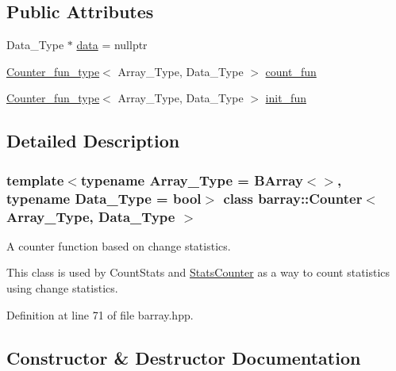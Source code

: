 \subsection*{Public Attributes}
\begin{DoxyCompactItemize}
\item 
Data\+\_\+\+Type $\ast$ \hyperlink{classbarray_1_1_counter_a8889606c8da26b72927ccc964a5f844a}{data} = nullptr
\item 
\hyperlink{namespacebarray_a94903bd0f37708633933ea88ac8e4c6a}{Counter\+\_\+fun\+\_\+type}$<$ Array\+\_\+\+Type, Data\+\_\+\+Type $>$ \hyperlink{classbarray_1_1_counter_a3da828c8a55302a3cbda73bb46916c36}{count\+\_\+fun}
\item 
\hyperlink{namespacebarray_a94903bd0f37708633933ea88ac8e4c6a}{Counter\+\_\+fun\+\_\+type}$<$ Array\+\_\+\+Type, Data\+\_\+\+Type $>$ \hyperlink{classbarray_1_1_counter_ac7f0223e4bd27dd7f876a628f14750b7}{init\+\_\+fun}
\end{DoxyCompactItemize}


\subsection{Detailed Description}
\subsubsection*{template$<$typename Array\+\_\+\+Type = B\+Array$<$$>$, typename Data\+\_\+\+Type = bool$>$\newline
class barray\+::\+Counter$<$ Array\+\_\+\+Type, Data\+\_\+\+Type $>$}

A counter function based on change statistics. 

This class is used by {\ttfamily Count\+Stats} and {\ttfamily \hyperlink{classbarray_1_1_stats_counter}{Stats\+Counter}} as a way to count statistics using change statistics. 

Definition at line 71 of file barray.\+hpp.



\subsection{Constructor \& Destructor Documentation}
\mbox{\label{classbarray_1_1_counter_a29e59942649210fb06f4f908854b3cae}} 
